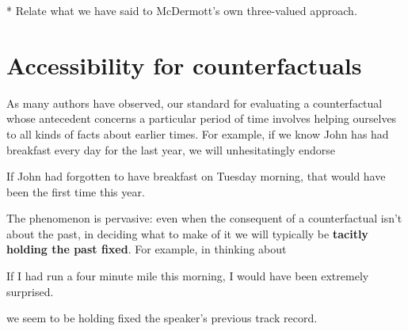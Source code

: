 \documentclass[If.tex]{subfiles}
\begin{document}
* Relate what we have said to McDermott's own three-valued approach.








\section{Accessibility for counterfactuals}\label{sect:cf}
As many authors have observed, our standard for evaluating a counterfactual whose antecedent concerns a particular period of time involves helping ourselves to all kinds of facts about earlier times. For example, if we know John has had breakfast every day for the last year, we will unhesitatingly endorse
\begin{prop}
	\nitem \label{breakfast}
		If John had forgotten to have breakfast on Tuesday morning, that would have been the first time this year.
\end{prop}
The phenomenon is pervasive: even when the consequent of a counterfactual isn't about the past, in deciding what to make of it we will typically be \textbf{tacitly holding the past fixed}. For example, in thinking about
\begin{prop}
	\nitem 
		If I had run a four minute mile this morning, I would have been extremely surprised.
\end{prop}
we seem to be holding fixed the speaker's previous track record.
\end{document}
